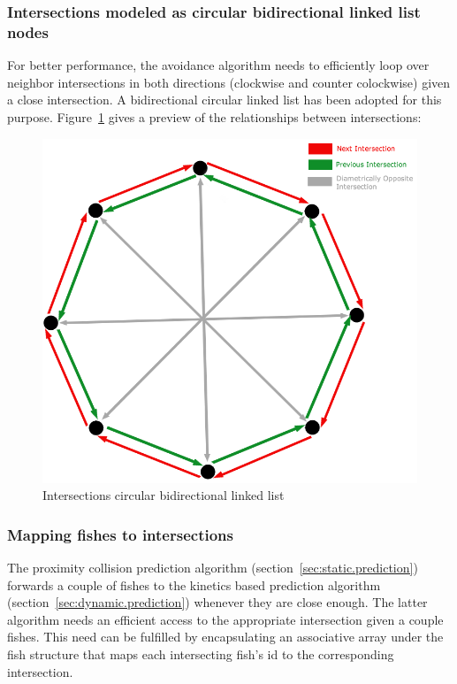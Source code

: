 \subsubsection{Intersections modeled as circular bidirectional linked list nodes }
For better performance, the avoidance algorithm needs to efficiently loop over neighbor intersections in both directions (clockwise and counter colockwise) given a close intersection. A bidirectional circular linked list has been adopted for this purpose. Figure~\ref{fig:linkedlist} gives a preview of the relationships between intersections:

\begin{figure}[H]
   \centering
   \includegraphics[scale=0.58]{figures/linkedlist.png}
   \caption{Intersections circular bidirectional linked list}
   \label{fig:linkedlist}
\end{figure}

\subsubsection{Mapping fishes to intersections}
The proximity collision prediction algorithm (section~\ref{sec:static.prediction}) forwards a couple of fishes to the kinetics based prediction algorithm (section~\ref{sec:dynamic.prediction}) whenever they are close enough. The latter algorithm needs an efficient access to the appropriate intersection given a couple fishes. This need can be fulfilled by encapsulating an associative array under the fish structure that maps each intersecting fish's id to the corresponding intersection.\\

